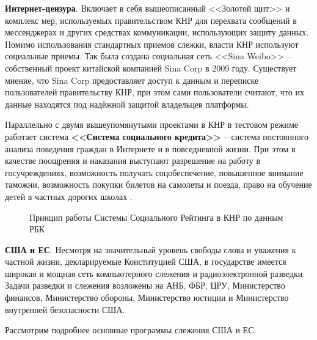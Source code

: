 	\textbf{Интернет-цензура}. Включает в себя вышеописанный <<Золотой щит>> и комплекс мер, используемых правительством КНР для перехвата сообщений в мессенджерах и других средствах коммуникации, использующих защиту данных. 	Помимо использования стандартных приемов слежки, власти КНР используют социальные приемы. Так была создана социальная сеть <<Sina Weibo>> -- собственный проект китайской компанией Sina Corp в 2009 году. Существует мнение, что Sina Corp предоставляет доступ к данным и переписке пользователей правительству КНР, при этом сами пользователи считают, что их данные находятся под надёжной защитой владельцев платформы. 
	
	Параллельно с двумя вышеупомянутыми проектами в КНР в тестовом режиме работает система \textbf{<<Система социального кредита>>} -- система постоянного анализа поведения граждан в Интернете и в повседневной жизни. При этом в качестве поощрения и наказания выступают разрешение на работу в госучреждениях, возможность получать соцобеспечение, повышенное внимание таможни, возможность покупки билетов на самолеты и поезда, право на обучение детей в частных дорогих школах  \cite{SocialCredit} \cite{SocialCredit2}. %
	\\
	\begin{figure*}[h!]
		\caption{ Принцип работы Системы Социального Рейтинга в КНР по данным РБК}
	\end{figure*} 
	\textbf{США и ЕС}. Несмотря на значительный уровень свободы слова и уважения к частной жизни, декларируемые Конституцией США, в государстве имеется широкая и мощная сеть компьютерного слежения и радиоэлектронной разведки. Задачи разведки  и слежения возложены на АНБ, ФБР, ЦРУ, Министерство финансов, Министерство обороны, Министерство юстиции и Министерство внутренней безопасности США.  
	
	Рассмотрим подробнее основные программы слежения США и ЕС:
	
